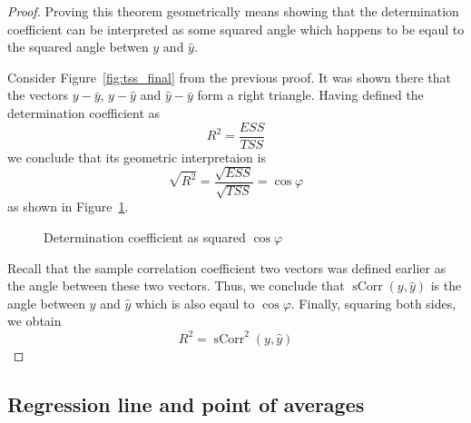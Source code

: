 \documentclass[nobib]{tufte-handout}
\DeclareMathOperator{\sCorr}{sCorr}
\theoremstyle{definition}
\begin{document}
\begin{proof}
Proving this theorem geometrically means showing that the determination coefficient can be interpreted as some squared angle
which happens to be eqaul to the squared angle betwen $y$ and $\hat y$.

Consider Figure~\ref{fig:tss_final} from the previous proof.
It was shown there that the vectors $y - \bar y$, $y - \hat y$ and $\hat y - \bar y$ form a right triangle.
Having defined the determination coefficient as
\[
R^2 = \frac{ESS}{TSS}
\]
we conclude that its geometric interpretaion is
\[
\sqrt{R^2} = \frac{\sqrt{ESS}}{\sqrt{TSS}} = \cos \varphi
\]
as shown in Figure~\ref{fig:r_sq_angle}.

\begin{figure}
  \caption{Determination coefficient as squared $\cos \varphi$}
  \label{fig:r_sq_angle}
\end{figure}

Recall that the sample correlation coefficient two vectors was defined earlier as the angle between these two vectors.
Thus, we conclude that $\sCorr(y, \hat y)$ is the angle between $y$ and $\hat y$ which is also eqaul to $\cos \varphi$.
Finally, squaring both sides, we obtain
\[
R^2 = \sCorr^2(y, \hat y)
\]
\end{proof}

\subsection{Regression line and point of averages}
\end{document}

